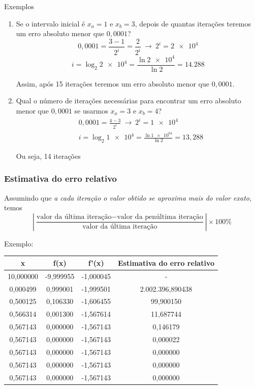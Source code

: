 \begin{frame}{Exemplos}
    \begin{enumerate}
        \item Se o intervalo inicial é $x_a=1$ e $x_b=3$, depois de quantas
            iterações teremos um erro absoluto menor que $0,0001$?
            \pause
            \[
                0,0001=\frac{3-1}{2^i}=\frac{2}{2^i} ~\rightarrow~ 2^i = \num{2e4}
            \]
            \pause
            \[
                i=\log_2 \num{2e4} = \frac{\ln \num{2e4}}{\ln 2}=\num{14.288}
            \]

            Assim, após 15 iterações teremos um erro absoluto menor que $0,0001$.

        \item Qual o número de iterações necessárias para encontrar um erro absoluto menor que $0,0001$ se usarmos $x_a=3$ e $x_b=4$?
            \pause
            \begin{align*}
& 0,0001 = \frac{4-3}{2^i} ~\rightarrow~ 2^i=\num{1e4} \\
& i=\log_2 \num{1e4}=\frac{\ln \num{1e+04}}{\ln 2}=13,288
            \end{align*}

            Ou seja, 14 iterações
    \end{enumerate}
\end{frame}

\begin{frame}
    \frametitle{Estimativa do erro relativo}

    Assumindo que \textit{a cada iteração o valor obtido se aproxima mais do valor exato}, temos
    \[
        \left| \frac{\text{valor da última iteração} - \text{valor da penúltima iteração}}
        {\text{valor da última iteração}}  \right| \times 100\%
    \]

    Exemplo:

    \centering
    \begin{tabular}{cccc}
        x & f(x) & f'(x) & Estimativa do erro relativo \\ \hline
        10,000000 & -9,999955 & -1,000045 & - \\ \hline
        0,000499 & 0,999001 & -1,999501 & 2.002.396,890438 \\ \hline
        0,500125 & 0,106330 & -1,606455 & 99,900150 \\ \hline
        0,566314 & 0,001300 & -1,567614 & 11,687744 \\ \hline
        0,567143 & 0,000000 & -1,567143 & 0,146179 \\ \hline
        0,567143 & 0,000000 & -1,567143 & 0,000022 \\ \hline
        0,567143 & 0,000000 & -1,567143 & 0,000000 \\ \hline
        0,567143 & 0,000000 & -1,567143 & 0,000000 \\ \hline
        0,567143 & 0,000000 & -1,567143 & 0,000000 
    \end{tabular}
\end{frame}
